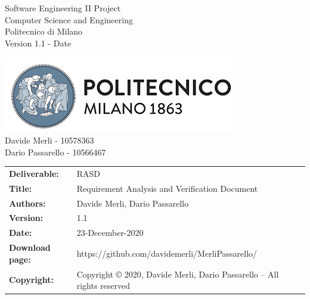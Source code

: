 \begin{titlepage}
\begin{center}
    \begin{multicols}{2}
      \large
      \begin{flushleft}
        Software Engineering II Project \\
        Computer Science and Engineering\\
        Politecnico di Milano\\
        Version 1.1 - Date \\
      \end{flushleft}
      \begin{flushright}
        \includegraphics[scale=0.6]{Images/PolimiLogo.png} \\
        Davide Merli - 10578363\\
        Dario Passarello - 10566467 \\
      \end{flushright}
    \end{multicols}
  \end{center}

\end{titlepage}

\begin{table}[h!]
  \begin{tabu} to \textwidth { X[0.4,r,p] X[0.7,l,p] }
    \hline

    \textbf{Deliverable:}   & RASD                                                                   \\
    \textbf{Title:}         & Requirement Analysis and Verification Document                         \\
    \textbf{Authors:}       & Davide Merli, Dario Passarello                                         \\
    \textbf{Version:}       & 1.1                                                              \\
    \textbf{Date:}          & 23-December-2020                                                       \\
    \textbf{Download page:} & https://github.com/davidemerli/MerliPassarello/                        \\
    \textbf{Copyright:}     & Copyright © 2020, Davide Merli, Dario Passarello – All rights reserved \\
    \hline
  \end{tabu}
\end{table}





